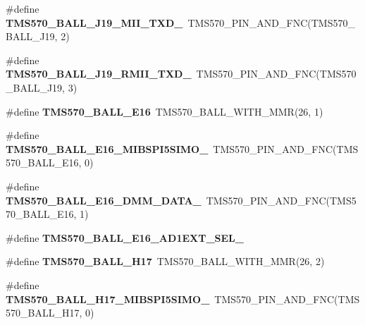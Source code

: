 \begin{DoxyCompactItemize}
\item 
\mbox{\label{tms570lc4357-pins_8h_a41a671446e6e5d8fa384a51af037975d}} 
\#define {\bfseries T\+M\+S570\+\_\+\+B\+A\+L\+L\+\_\+\+J19\+\_\+\+M\+I\+I\+\_\+\+T\+X\+D\+\_}~T\+M\+S570\+\_\+\+P\+I\+N\+\_\+\+A\+N\+D\+\_\+\+F\+NC(T\+M\+S570\+\_\+\+B\+A\+L\+L\+\_\+\+J19, 2)
\item 
\mbox{\label{tms570lc4357-pins_8h_a9d6f179b623fdf5c422803ccb36f677a}} 
\#define {\bfseries T\+M\+S570\+\_\+\+B\+A\+L\+L\+\_\+\+J19\+\_\+\+R\+M\+I\+I\+\_\+\+T\+X\+D\+\_}~T\+M\+S570\+\_\+\+P\+I\+N\+\_\+\+A\+N\+D\+\_\+\+F\+NC(T\+M\+S570\+\_\+\+B\+A\+L\+L\+\_\+\+J19, 3)
\item 
\mbox{\label{tms570lc4357-pins_8h_abf4b089016f9be72c441402bec4e570b}} 
\#define {\bfseries T\+M\+S570\+\_\+\+B\+A\+L\+L\+\_\+\+E16}~T\+M\+S570\+\_\+\+B\+A\+L\+L\+\_\+\+W\+I\+T\+H\+\_\+\+M\+MR(26, 1)
\item 
\mbox{\label{tms570lc4357-pins_8h_a70738574934e08b62b7e9ae4e03bb51a}} 
\#define {\bfseries T\+M\+S570\+\_\+\+B\+A\+L\+L\+\_\+\+E16\+\_\+\+M\+I\+B\+S\+P\+I5\+S\+I\+M\+O\+\_}~T\+M\+S570\+\_\+\+P\+I\+N\+\_\+\+A\+N\+D\+\_\+\+F\+NC(T\+M\+S570\+\_\+\+B\+A\+L\+L\+\_\+\+E16, 0)
\item 
\mbox{\label{tms570lc4357-pins_8h_a4d737386789c5d11ccad6434f38885c4}} 
\#define {\bfseries T\+M\+S570\+\_\+\+B\+A\+L\+L\+\_\+\+E16\+\_\+\+D\+M\+M\+\_\+\+D\+A\+T\+A\+\_}~T\+M\+S570\+\_\+\+P\+I\+N\+\_\+\+A\+N\+D\+\_\+\+F\+NC(T\+M\+S570\+\_\+\+B\+A\+L\+L\+\_\+\+E16, 1)
\item 
\#define {\bfseries T\+M\+S570\+\_\+\+B\+A\+L\+L\+\_\+\+E16\+\_\+\+A\+D1\+E\+X\+T\+\_\+\+S\+E\+L\+\_}
\item 
\mbox{\label{tms570lc4357-pins_8h_a62be6f1e53c1a5df24a0725c7d51c5d6}} 
\#define {\bfseries T\+M\+S570\+\_\+\+B\+A\+L\+L\+\_\+\+H17}~T\+M\+S570\+\_\+\+B\+A\+L\+L\+\_\+\+W\+I\+T\+H\+\_\+\+M\+MR(26, 2)
\item 
\mbox{\label{tms570lc4357-pins_8h_a3aa1316f1276c54a999ead8029e054b4}} 
\#define {\bfseries T\+M\+S570\+\_\+\+B\+A\+L\+L\+\_\+\+H17\+\_\+\+M\+I\+B\+S\+P\+I5\+S\+I\+M\+O\+\_}~T\+M\+S570\+\_\+\+P\+I\+N\+\_\+\+A\+N\+D\+\_\+\+F\+NC(T\+M\+S570\+\_\+\+B\+A\+L\+L\+\_\+\+H17, 0)

\end{DoxyCompactItemize}
